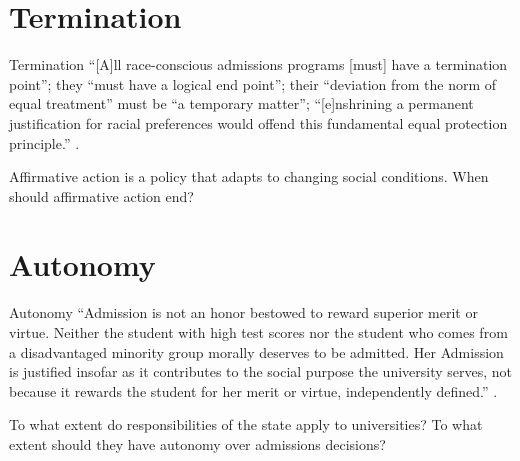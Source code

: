 \documentclass[ignorenonframetext, aspectratio=169]{beamer}
\begin{document}
\section{Termination}
\begin{frame}{Termination}
``[A]ll race-conscious admissions programs [must] have a termination point''; they ``must have a logical end point''; their ``deviation from the norm of equal treatment'' must be ``a temporary matter''; ``[e]nshrining a permanent justification for racial preferences would offend this fundamental equal protection principle.'' .

Affirmative action is a policy that adapts to changing social conditions. When should affirmative action end?
\end{frame}

\section{Autonomy}
\begin{frame}{Autonomy}
``Admission is not an honor bestowed to reward superior merit or virtue. Neither the student with high test scores nor the student who comes from a disadvantaged minority group morally deserves to be admitted. Her Admission is justified insofar as it contributes to the social purpose the university serves, not because it rewards the student for her merit or virtue, independently defined.'' .

To what extent do responsibilities of the state apply to universities? To  what extent should they have autonomy over admissions decisions?
\end{frame}
\end{document}
